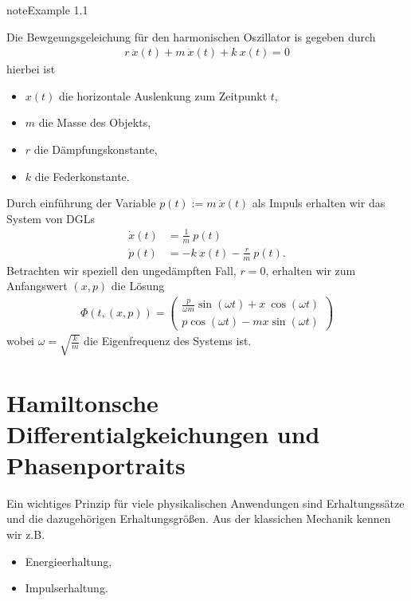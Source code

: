 \documentclass[letterpaper,10pt,english]{jupyterBook}
\begin{document}
\begin{sphinxadmonition}{note}{Example 1.1}



Die Bewgeungsgeleichung für den harmonischen Oszillator is gegeben durch
\begin{equation*}
\begin{split}r~\ddot{x}(t) + m~\dot{x}(t) + k~x(t)=0\end{split}
\end{equation*}
hierbei ist
\begin{itemize}
\item {} 
\(x(t)\) die horizontale Auslenkung zum Zeitpunkt \(t\),

\item {} 
\(m\) die Masse des Objekts,

\item {} 
\(r\) die Dämpfungskonstante,

\item {} 
\(k\) die Federkonstante.

\end{itemize}

Durch einführung der Variable \(p(t):= m~\dot{x}(t)\) als Impuls erhalten wir das System von DGLs
\begin{equation*}
\begin{split}\dot{x}(t) &= \frac{1}{m}~p(t) \\
\dot{p}(t) &= -k~x(t) - \frac{r}{m}~p(t).\end{split}
\end{equation*}
Betrachten wir speziell den ungedämpften Fall, \(r=0\), erhalten wir zum Anfangswert \((x,p)\) die Lösung
\begin{equation*}
\begin{split}\Phi(t, (x,p)) = 
\begin{pmatrix}
\frac{p}{\omega m}\sin(\omega t) + x~\cos(\omega t)\\
p \cos(\omega t) - m x \sin(\omega t)
\end{pmatrix}\end{split}
\end{equation*}
wobei \(\omega=\sqrt{\frac{k}{m}}\) die Eigenfrequenz des Systems ist.
\end{sphinxadmonition}

\noindent{}


\section{Hamiltonsche Differentialgkeichungen und Phasenportraits}
\label{\detokenize{ode/hamilton:hamiltonsche-differentialgkeichungen-und-phasenportraits}}\label{\detokenize{ode/hamilton::doc}}
Ein wichtiges Prinzip für viele physikalischen Anwendungen sind Erhaltungssätze und die dazugehörigen Erhaltungsgrößen. Aus der klassichen Mechanik kennen wir z.B.
\begin{itemize}
\item {} 
Energieerhaltung,

\item {} 
Impulserhaltung.

\end{itemize}
\end{document}
